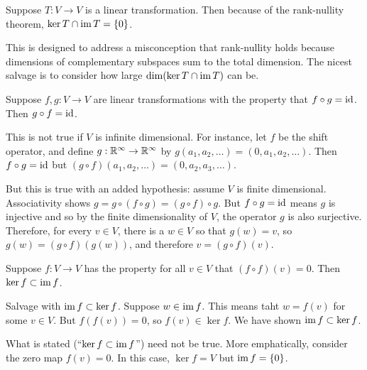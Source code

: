 \documentclass{homework}
\begin{document}
\begin{problem}
  Suppose $T : V \to V$ is a linear transformation.  Then because of the rank-nullity theorem, $\ker T \cap \operatorname{im} T = \{0\}$.
\end{problem}

\begin{solution}
  This is designed to address a misconception that rank-nullity holds
  because dimensions of complementary subspaces sum to the total
  dimension.  The nicest salvage is to consider how large
  $\dim (\ker T \cap \operatorname{im} T)$ can be.
\end{solution}

\begin{problem}
  Suppose $f, g: V \to V$ are linear transformations with the property that $f \circ g = \operatorname{id}$.  Then $g \circ f = \operatorname{id}$.
\end{problem}

\begin{solution}
  This is not true if $V$ is infinite dimensional.  For instance, let
  $f$ be the shift operator, and define $g : \mathbb{R}^\infty \to \mathbb{R}^\infty$
  by $g(a_1,a_2,\ldots) = (0,a_1,a_2,\ldots)$.  Then $f \circ g = \operatorname{id}$
  but $(g \circ f)(a_1,a_2,\ldots) = (0,a_2,a_3,\ldots)$.

  But this is true with an added hypothesis: assume $V$ is finite
  dimensional.  Associativity shows
  $g = g \circ (f \circ g) = (g \circ f) \circ g$.  But
  $f \circ g = \operatorname{id}$ means $g$ is injective and so by the finite
  dimensionality of $V$, the operator $g$ is also surjective.
  Therefore, for every $v \in V$, there is a $w \in V$ so that
  $g(w) = v$, so $g(w) = (g \circ f)(g(w))$, and therefore
  $v = (g \circ f)(v)$.
\end{solution}

\begin{problem}
  Suppose $f : V \to V$ has the property for all $v \in V$ that $(f \circ f)(v) = 0$.  Then $\ker f \subset \operatorname{im} f$.
\end{problem}

\begin{solution}
  Salvage with $\operatorname{im} f \subset \ker f$.  Suppose $w \in \operatorname{im} f$.
  This means taht $w = f(v)$ for some $v \in V$.  But $f(f(v)) = 0$,
  so $f(v) \in \ker f$.  We have shown $\operatorname{im} f \subset \ker f$.

  What is stated (``$\ker f \subset \operatorname{im} f$'') need not be true.
  More emphatically, consider the zero map $f(v) = 0$.  In this case,
  $\ker f = V$ but $\operatorname{im} f = \{0\}$.
\end{solution}
\end{document}
